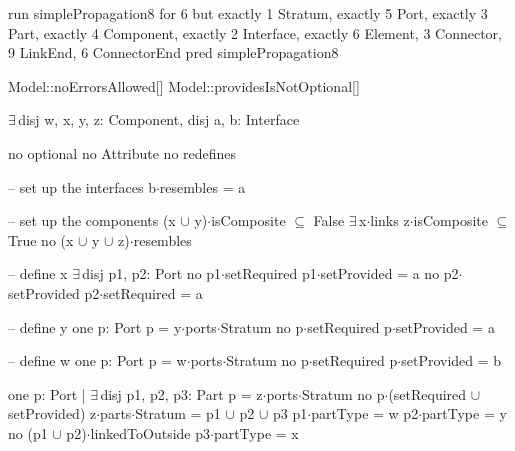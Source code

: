 run simplePropagation8 for 6 but exactly 1 Stratum, exactly 5 Port, exactly 3 Part, exactly 4 Component, exactly 2 Interface, exactly 6 Element, 3 Connector, 9 LinkEnd, 6 ConnectorEnd
pred simplePropagation8
{
  Model::noErrorsAllowed[]
  Model::providesIsNotOptional[]

  $\exists\,$disj w, x, y, z: Component,
       disj a, b: Interface
  {
    no optional
    no Attribute
    no redefines
  
    -- set up the interfaces
    b$\cdot$resembles = a
  
    -- set up the components
    (x $\cup$ y)$\cdot$isComposite $\subseteq$ False
    $\exists\,$x$\cdot$links
    z$\cdot$isComposite $\subseteq$ True
    no (x $\cup$ y $\cup$ z)$\cdot$resembles
    
    -- define x
    $\exists\,$disj p1, p2: Port
    {
      no p1$\cdot$setRequired
      p1$\cdot$setProvided = a
      no p2$\cdot$setProvided
      p2$\cdot$setRequired = a
    }
    
    -- define y
    one p: Port
    {
      p = y$\cdot$ports$\cdot$Stratum
      no p$\cdot$setRequired
      p$\cdot$setProvided = a
    }
    
    -- define w
    one p: Port
    {
      p = w$\cdot$ports$\cdot$Stratum
      no p$\cdot$setRequired
      p$\cdot$setProvided = b
    }
    
    one p: Port | $\exists\,$disj p1, p2, p3: Part
    {
      p = z$\cdot$ports$\cdot$Stratum
      no p$\cdot$(setRequired $\cup$ setProvided)
      z$\cdot$parts$\cdot$Stratum = p1 $\cup$ p2 $\cup$ p3
      p1$\cdot$partType = w
      p2$\cdot$partType = y
      no (p1 $\cup$ p2)$\cdot$linkedToOutside
      p3$\cdot$partType = x      
    }
  }
}

